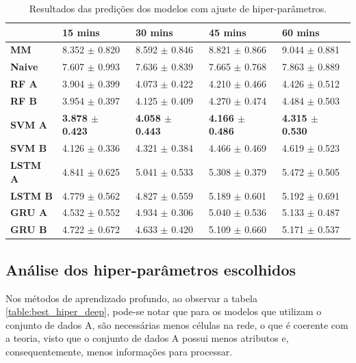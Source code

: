 \begin{table}[H]
    \begin{tabular*}{\linewidth}{@{\extracolsep{\fill}}lllll}
    \toprule
     & 
    \multicolumn{1}{l}{\textbf{15 mins}} & 
    \multicolumn{1}{l}{\textbf{30 mins}} &
    \multicolumn{1}{l}{\textbf{45 mins}} &
    \multicolumn{1}{l}{\textbf{60 mins}} \\
\midrule
\textbf{MM} & 8.352 $\pm$ 0.820 & 8.592 $\pm$ 0.846 & 8.821 $\pm$ 0.866 & 9.044 $\pm$ 0.881
\\
\midrule
\textbf{Naive} & 7.607 $\pm$ 0.993 & 7.636 $\pm$ 0.839 & 7.665 $\pm$ 0.768 & 7.863 $\pm$ 0.889
\\
\midrule
\textbf{RF A} & 3.904 $\pm$ 0.399 & 4.073 $\pm$ 0.422 & 4.210 $\pm$ 0.466 & 4.426 $\pm$ 0.512
\\
\midrule
\textbf{RF B} & 3.954 $\pm$ 0.397 & 4.125 $\pm$ 0.409 & 4.270 $\pm$ 0.474 & 4.484 $\pm$ 0.503
\\
\midrule
\textbf{SVM A} & \textbf{3.878 $\pm$ 0.423} & \textbf{4.058 $\pm$ 0.443} & \textbf{4.166 $\pm$ 0.486} & \textbf{4.315 $\pm$ 0.530}
\\
\midrule
\textbf{SVM B} & 4.126 $\pm$ 0.336 & 4.321 $\pm$ 0.384 & 4.466 $\pm$ 0.469 & 4.619 $\pm$ 0.523
\\
\midrule
\textbf{LSTM A} & 4.841 $\pm$ 0.625 & 5.041 $\pm$ 0.533 & 5.308 $\pm$ 0.379 & 5.472 $\pm$ 0.505
\\
\midrule
\textbf{LSTM B} & 4.779 $\pm$ 0.562 & 4.827 $\pm$ 0.559 & 5.189 $\pm$ 0.601 & 5.192 $\pm$ 0.691
\\
\midrule
\textbf{GRU A} & 4.532 $\pm$ 0.552 & 4.934 $\pm$ 0.306 & 5.040 $\pm$ 0.536 & 5.133 $\pm$ 0.487
\\
\midrule
\textbf{GRU B} & 4.722 $\pm$ 0.672 & 4.633 $\pm$ 0.420 & 5.109 $\pm$ 0.660 & 5.171 $\pm$ 0.537
\\
    \bottomrule
    \end{tabular*}
    \label{table:curto_prazo_tuning}
    \caption{Resultados das predições dos modelos com ajuste de hiper-parâmetros.}
\end{table}

\subsection{Análise dos hiper-parâmetros escolhidos}

Nos métodos de aprendizado profundo, ao observar a tabela \ref{table:best_hiper_deep}, pode-se notar que para os modelos que utilizam o conjunto de dados A, são necessárias menos células na rede, o que é coerente com a teoria, visto que o conjunto de dados A possui menos atributos e, consequentemente, menos informações para processar.

